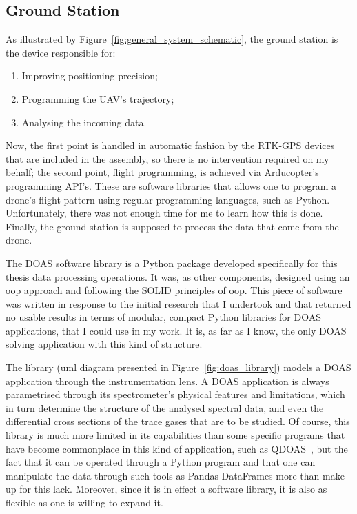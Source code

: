 \subsection{Ground Station}%
\label{sub:methods_ground_station}

As illustrated by Figure~\ref{fig:general_system_schematic}, the ground
station is the device responsible for:
\begin{enumerate}
    \item Improving positioning precision;
    \item Programming the \gls{UAV}'s trajectory;
    \item Analysing the incoming data.
\end{enumerate}

Now, the first point is handled in automatic fashion by the
\gls{RTK-GPS} devices that are included in the assembly, so there is no
intervention required on my behalf; the second point, flight
programming, is achieved via Arducopter's programming API's. These are
software libraries that allows one to program a drone's flight pattern
using regular programming languages, such as Python. Unfortunately,
there was not enough time for me to learn how this is done. Finally, the
ground station is supposed to process the data that come from the drone.

The \gls{DOAS} software library is a Python package developed
specifically for this thesis data processing operations. It was, as
other components, designed using an \gls{oop} approach and following the
SOLID principles of \acrlong{oop}. This piece of software was written in
response to the initial research that I undertook and that returned no
usable results in terms of modular, compact Python libraries for
\gls{DOAS} applications, that I could use in my work. It is, as far as I
know,  the only \gls{DOAS} solving application with this kind of
structure.

The library (\gls{uml} diagram presented in
Figure~\ref{fig:doas_library}) models a \gls{DOAS} application through
the instrumentation lens. A \gls{DOAS} application is always
parametrised through its spectrometer's physical features and
limitations, which in turn determine the structure of the analysed
spectral data, and even the differential cross sections of the trace
gases that are to be studied. Of course, this library is much more
limited in its capabilities than some specific programs that have become
commonplace in this kind of application, such as
QDOAS~\cite{Danckaert2015}, but the fact that it can be operated through
a Python program and that one can manipulate the data through such tools
as Pandas DataFrames more than make up for this lack. Moreover, since it
is in effect a software library, it is also as flexible as one is
willing to expand it.

